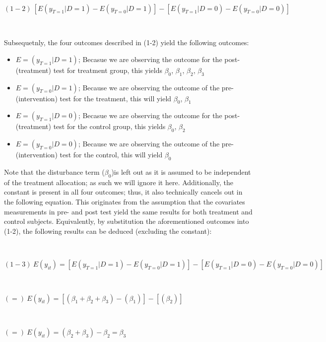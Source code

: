 \documentclass[a4paper]{article}
\begin{document}
\

$
(1-2) \ [E(y_{T=1} | D=1) - E(y_{T=0} | D=1)] - [E(y_{T=1} | D=0) - E(y_{T=0} | D=0)]
$

\

Subsequetnly, the four outcomes described in (1-2) yield the following outcomes:

\begin{itemize}
\item $E = (y_{T=1} | D=1)$; Becasue we are observing the outcome for the post-(treatment) test for treatment group, this yields $\beta_{0}$, $\beta_{1}$, $\beta_{2}$, $\beta_{3}$
\item $E = (y_{T=0} | D=1)$; Because we are observing the outcome of the pre-(intervention) test for the treatment, this will yield $\beta_{0}$, $\beta_{1}$
\item $E = (y_{T=1} | D=0)$; Becasue we are observing the outcome for the post-(treatment) test for the control group, this yields $\beta_{0}$, $\beta_{2}$ 
\item $E = (y_{T=0} | D=0)$; Because we are observing the outcome of the pre-(intervention) test for the control, this will yield $\beta_{0}$
\end{itemize}

Note that the disturbance term ($\beta_{0}$)is left out as it is assumed to be independent of the treatment allocation; as such we will ignore it here. 
Additionally, the constant is present in all four outcomes; thus, it also technically cancels out in the following equation. This originates from the assumption that the covariates measurements in pre- and post test yield the same results for both treatment and control subjects. Equivalently, by substitution the aforementioned outcomes into (1-2), the following results can be deduced (excluding the constant):

\

$
(1-3) \ E(y_{it}) =  [E(y_{T=1} | D=1) - E(y_{T=0} | D=1)] - [E(y_{T=1} | D=0) - E(y_{T=0} | D=0)]
$

\

$
 (=) \ E(y_{it}) = [(\beta_{1} + \beta_{2} + \beta_{3}) - (\beta_{1})] - [(\beta_{2})]
$

\

$
(=) \ E(y_{it}) = (\beta_{2} + \beta_{3}) - \beta_{2} = \beta_{3}
$
\end{document}
